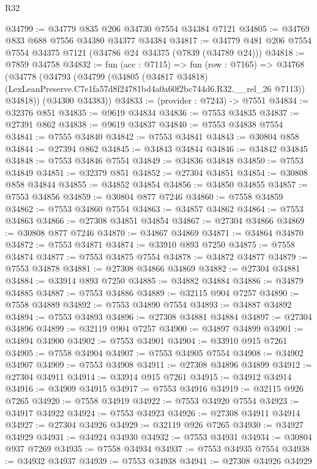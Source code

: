 \begin{lexlean}{R32}
\begin{coremodule}
@34799 := @34779 @835 @206 @34730 @7554 @34384 @7121
@34805 := @34769 @833 @688 @7556 @34380 @34377 @34384
@34817 := @34779 @481 @206 @7554 @7554 @34375 @7121 (@34786 @24 @34375 (@7839 (@34789 @24)))
@34818 := @7859 @34758
@34832 := fun (acc : @7115) =>
  fun (row : @7165) =>
  @34768
    (@34778
      (@34793
        (@34799
          (@34805
            (@34817 @34818)
            (LexLeanPreserve.C7e1fa57d8f24781bd4a0a60f2bc744d6.R32.__rel_26 @7113))
          @34818))
      (@34300 @34383))
@34833 := (provider : @7243) -> @7551
@34834 := @32376 @851
@34835 := @9619 @34834
@34836 := @7553 @34835
@34837 := @27391 @862
@34838 := @9619 @34837
@34840 := @7553 @34838 @7554
@34841 := @7555 @34840
@34842 := @7553 @34841
@34843 := @30804 @858
@34844 := @27394 @862
@34845 := @34843 @34844
@34846 := @34842 @34845
@34848 := @7553 @34846 @7554
@34849 := @34836 @34848
@34850 := @7553 @34849
@34851 := @32379 @851
@34852 := @27304 @34851
@34854 := @30808 @858 @34844
@34855 := @34852 @34854
@34856 := @34850 @34855
@34857 := @7553 @34856
@34859 := @30804 @877 @7246
@34860 := @7558 @34859
@34862 := @7553 @34860 @7554
@34863 := @34857 @34862
@34864 := @7553 @34863
@34866 := @27308 @34851 @34854
@34867 := @27304 @34866
@34869 := @30808 @877 @7246
@34870 := @34867 @34869
@34871 := @34864 @34870
@34872 := @7553 @34871
@34874 := @33910 @893 @7250
@34875 := @7558 @34874
@34877 := @7553 @34875 @7554
@34878 := @34872 @34877
@34879 := @7553 @34878
@34881 := @27308 @34866 @34869
@34882 := @27304 @34881
@34884 := @33914 @893 @7250
@34885 := @34882 @34884
@34886 := @34879 @34885
@34887 := @7553 @34886
@34889 := @32115 @904 @7257
@34890 := @7558 @34889
@34892 := @7553 @34890 @7554
@34893 := @34887 @34892
@34894 := @7553 @34893
@34896 := @27308 @34881 @34884
@34897 := @27304 @34896
@34899 := @32119 @904 @7257
@34900 := @34897 @34899
@34901 := @34894 @34900
@34902 := @7553 @34901
@34904 := @33910 @915 @7261
@34905 := @7558 @34904
@34907 := @7553 @34905 @7554
@34908 := @34902 @34907
@34909 := @7553 @34908
@34911 := @27308 @34896 @34899
@34912 := @27304 @34911
@34914 := @33914 @915 @7261
@34915 := @34912 @34914
@34916 := @34909 @34915
@34917 := @7553 @34916
@34919 := @32115 @926 @7265
@34920 := @7558 @34919
@34922 := @7553 @34920 @7554
@34923 := @34917 @34922
@34924 := @7553 @34923
@34926 := @27308 @34911 @34914
@34927 := @27304 @34926
@34929 := @32119 @926 @7265
@34930 := @34927 @34929
@34931 := @34924 @34930
@34932 := @7553 @34931
@34934 := @30804 @937 @7269
@34935 := @7558 @34934
@34937 := @7553 @34935 @7554
@34938 := @34932 @34937
@34939 := @7553 @34938
@34941 := @27308 @34926 @34929

\end{coremodule}
\end{lexlean}
